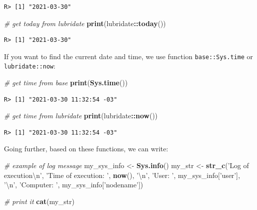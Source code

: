 \documentclass[
  12pt,
]{book}
\newenvironment{Shaded}{\begin{snugshade}}{\end{snugshade}}
\newcommand{\CharTok}[1]{\textcolor[rgb]{0.5,0.5,0.5}{#1}}
\newcommand{\CommentTok}[1]{\textcolor[rgb]{0.37,0.37,0.37}{\textit{#1}}}
\newcommand{\KeywordTok}[1]{\textcolor[rgb]{0.27,0.27,0.27}{\textbf{#1}}}
\newcommand{\NormalTok}[1]{#1}
\newcommand{\OperatorTok}[1]{\textcolor[rgb]{0.43,0.43,0.43}{\textbf{#1}}}
\newcommand{\StringTok}[1]{\textcolor[rgb]{0.5,0.5,0.5}{#1}}
\begin{document}
\begin{verbatim}
R> [1] "2021-03-30"
\end{verbatim}

\begin{Shaded}
\begin{Highlighting}[]
\CommentTok{# get today from lubridate}
\KeywordTok{print}\NormalTok{(lubridate}\OperatorTok{::}\KeywordTok{today}\NormalTok{())}
\end{Highlighting}
\end{Shaded}

\begin{verbatim}
R> [1] "2021-03-30"
\end{verbatim}

If you want to find the current date and time, we use function \texttt{base::Sys.time} or \texttt{lubridate::now}:  

\begin{Shaded}
\begin{Highlighting}[]
\CommentTok{# get time from base}
\KeywordTok{print}\NormalTok{(}\KeywordTok{Sys.time}\NormalTok{())}
\end{Highlighting}
\end{Shaded}

\begin{verbatim}
R> [1] "2021-03-30 11:32:54 -03"
\end{verbatim}

\begin{Shaded}
\begin{Highlighting}[]
\CommentTok{# get time from lubridate}
\KeywordTok{print}\NormalTok{(lubridate}\OperatorTok{::}\KeywordTok{now}\NormalTok{())}
\end{Highlighting}
\end{Shaded}

\begin{verbatim}
R> [1] "2021-03-30 11:32:54 -03"
\end{verbatim}

Going further, based on these functions, we can write:

\begin{Shaded}
\begin{Highlighting}[]
\CommentTok{# example of log message}
\NormalTok{my_sys_info <-}\StringTok{ }\KeywordTok{Sys.info}\NormalTok{()}
\NormalTok{my_str <-}\StringTok{ }\KeywordTok{str_c}\NormalTok{(}\StringTok{'Log of execution}\CharTok{\textbackslash{}n}\StringTok{'}\NormalTok{,}
                \StringTok{'Time of execution: '}\NormalTok{, }\KeywordTok{now}\NormalTok{(), }\StringTok{'}\CharTok{\textbackslash{}n}\StringTok{'}\NormalTok{,}
                \StringTok{'User: '}\NormalTok{, my_sys_info[}\StringTok{'user'}\NormalTok{], }\StringTok{'}\CharTok{\textbackslash{}n}\StringTok{'}\NormalTok{,}
                \StringTok{'Computer: '}\NormalTok{, my_sys_info[}\StringTok{'nodename'}\NormalTok{])}

\CommentTok{# print it}
\KeywordTok{cat}\NormalTok{(my_str)}
\end{Highlighting}
\end{Shaded}
\end{document}
